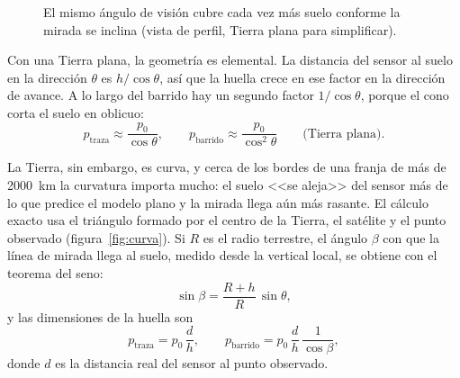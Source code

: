 \begin{figure}[ht]
\centering
{}
\caption{El mismo ángulo de visión cubre cada vez más suelo conforme la mirada se inclina (vista
de perfil, Tierra plana para simplificar).}
\label{fig:crecimiento}
\end{figure}

Con una Tierra plana, la geometría es elemental. La distancia del sensor al suelo en la
dirección $\theta$ es $h/\cos\theta$, así que la huella crece en ese factor en la dirección de
avance. A lo largo del barrido hay un segundo factor $1/\cos\theta$, porque el cono corta el
suelo en oblicuo:
\begin{equation}\label{eq:plano}
  p_{\text{traza}} \approx \frac{p_0}{\cos\theta},
  \qquad
  p_{\text{barrido}} \approx \frac{p_0}{\cos^2\theta}
  \qquad\text{(Tierra plana).}
\end{equation}

La Tierra, sin embargo, es curva, y cerca de los bordes de una franja de más de 2000~km la
curvatura importa mucho: el suelo <<se aleja>> del sensor más de lo que predice el modelo plano
y la mirada llega aún más rasante. El cálculo exacto usa el triángulo formado por el centro de la
Tierra, el satélite y el punto observado (figura~\ref{fig:curva}). Si $R$ es el radio terrestre,
el ángulo $\beta$ con que la línea de mirada llega al suelo, medido desde la vertical local, se
obtiene con el teorema del seno:
\begin{equation}\label{eq:cenit}
  \sin\beta = \frac{R+h}{R}\,\sin\theta ,
\end{equation}
y las dimensiones de la huella son
\begin{equation}\label{eq:curvo}
  p_{\text{traza}} = p_0\,\frac{d}{h},
  \qquad
  p_{\text{barrido}} = p_0\,\frac{d}{h}\,\frac{1}{\cos\beta},
\end{equation}
donde $d$ es la distancia real del sensor al punto observado.

